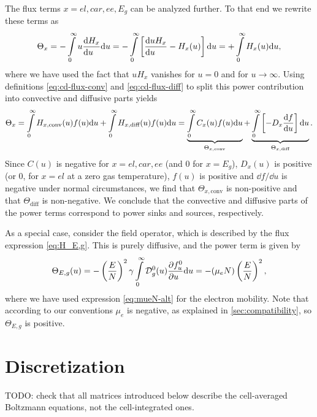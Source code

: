 \documentclass{book}
\begin{document}
The flux terms $x=el,car,ee,E_g$ can be analyzed further. To that end we rewrite
these terms as
\begin{equation}
	\Theta_x
	= -\int\limits_0^\infty u\DERIV{H_{x}}{u}\dd{u}
	= -\int\limits_0^\infty \left[\DERIV{uH_{x}}{u}-H_x(u)\right]\dd{u}
	= +\int\limits_0^\infty H_x(u)\dd{u},
\end{equation}
where we have used the fact that $uH_{x}$ vanishes for $u=0$ and for
$u\rightarrow\infty$.  Using definitions \eqref{eq:cd-flux-conv} and
\eqref{eq:cd-flux-diff} to split this power contribution into convective and
diffusive parts yields
\begin{equation}
	\Theta_x
	= \int\limits_0^\infty H_{x,\text{conv}}(u)f(u) \dd{u}
	+ \int\limits_0^\infty H_{x,\text{diff}}(u)f(u) \dd{u}
	= \underbrace{\int\limits_0^\infty C_x(u)f(u) \dd{u}}_{\Theta_{x,\text{conv}}}
	+ \underbrace{\int\limits_0^\infty \left[-D_x\DERIV{f}{u}\right]\dd{u}}_{\Theta_{x,\text{diff}}}.
\end{equation}
Since $C(u)$ is negative for $x=el,car,ee$ (and $0$ for $x=E_g$), $D_x(u)$
is positive (or $0$, for $x=el$ at a zero gas temperature), $f(u)$ is
positive and $\dd{f}/\dd{u}$ is negative under normal circumstances, we find
that $\Theta_{x,\text{conv}}$ is non-positive and that $\Theta_{\text{diff}}$
is non-negative. We conclude that the convective and diffusive parts of the
power terms correspond to power sinks and sources, respectively.

As a special case, consider the field operator, which is described by the
flux expression \eqref{eq:H_E,g}. This is purely diffusive, and the power term
is given by
\begin{equation}
	\Theta_{E,g}(u)
	= -\left(\frac{E}{N}\right)^2 \gamma\int\limits_0^\infty{\cal D}_{g}^0(u)\PDEV{f^0_u}{u}\dd{u}
	= -(\mu_e N)\left(\frac{E}{N}\right)^2,
	\label{eq:Theta_Eg}
\end{equation}
where we have used expression \eqref{eq:mueN-alt} for the electron mobility.
Note that according to our conventions $\mu_e$ is negative, as explained in
\ref{sec:compatibility}, so $\Theta_{E,g}$ is positive.

\chapter{Discretization}

\label{ch:disc}

TODO: check that all matrices introduced below describe the cell-averaged Boltzmann
equations, not the cell-integrated ones.
\end{document}
